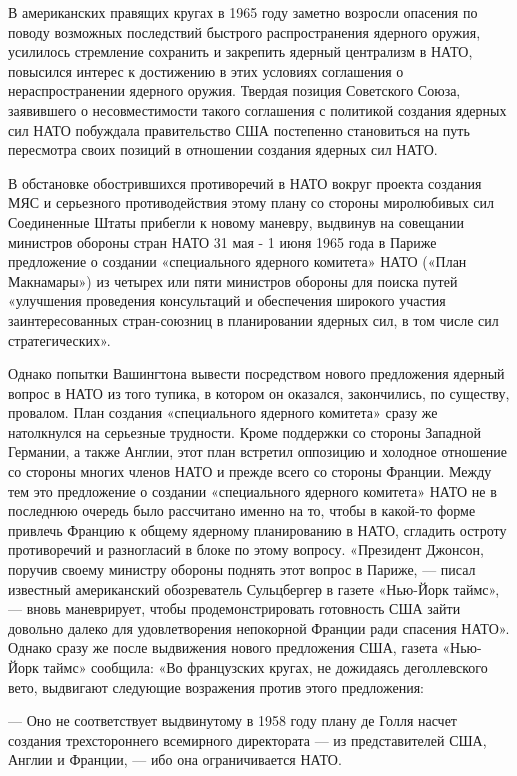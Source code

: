 \documentclass[12pt, a4paper, openany]{book}
\begin{document}
		В американских правящих кругах в 1965 году заметно возросли опасения по поводу возможных последствий быстрого распространения ядерного оружия, усилилось стремление сохранить и закрепить ядерный централизм в НАТО, повысился интерес к достижению в этих условиях соглашения о нераспространении ядерного оружия. Твердая позиция Советского Союза, заявившего о несовместимости такого соглашения с политикой создания ядерных сил НАТО побуждала правительство США постепенно становиться на путь пересмотра своих позиций в отношении создания ядерных сил НАТО.
		
		В обстановке обострившихся противоречий в НАТО вокруг проекта создания МЯС и серьезного противодействия этому плану со стороны миролюбивых сил Соединенные Штаты прибегли к новому маневру, выдвинув на совещании министров обороны стран НАТО 31 мая - 1 июня 1965 года в Париже предложение о создании «специального ядерного комитета» НАТО («План Макнамары») из четырех или пяти министров обороны для поиска путей «улучшения проведения консультаций и обеспечения широкого участия заинтересованных стран-союзниц в планировании ядерных сил, в том числе сил стратегических».
		
		Однако попытки Вашингтона вывести посредством нового предложения ядерный вопрос в НАТО из того тупика, в котором он оказался, закончились, по существу, провалом. План создания «специального ядерного комитета» сразу же натолкнулся на серьезные трудности. Кроме поддержки со стороны Западной Германии, а также Англии, этот план встретил оппозицию и холодное отношение со стороны многих членов НАТО и прежде всего со стороны Франции. Между тем это предложение о создании «специального ядерного комитета» НАТО не в последнюю очередь было рассчитано именно на то, чтобы в какой-то форме привлечь Францию к общему ядерному планированию в НАТО, сгладить остроту противоречий и разногласий в блоке по этому вопросу. «Президент Джонсон, поручив своему министру обороны поднять этот вопрос в Париже, — писал известный американский обозреватель Сульцбергер в газете «Нью-Йорк таймс», — вновь маневрирует, чтобы продемонстрировать готовность США зайти довольно далеко для удовлетворения непокорной Франции ради спасения НАТО». Однако сразу же после выдвижения нового предложения США, газета «Нью-Йорк таймс» сообщила: «Во французских кругах, не дожидаясь деголлевского вето, выдвигают следующие возражения против этого предложения:
		
		— Оно не соответствует выдвинутому в 1958 году плану де Голля насчет создания трехстороннего всемирного директората — из представителей США, Англии и Франции, — ибо она ограничивается НАТО.
		
\end{document}
